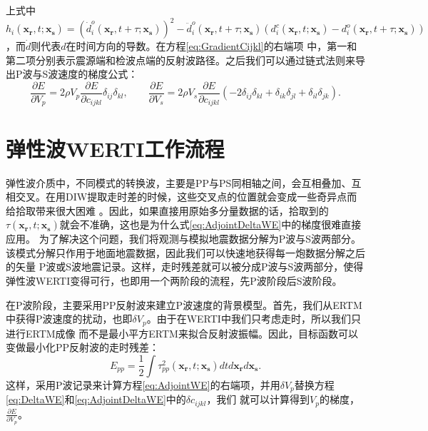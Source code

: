 上式中$h_i(\mathbf{x_r},t;\mathbf{x_s})=(\dot{d}^o_i(\mathbf{x_r},t+\tau;\mathbf{x_s}))^2-\ddot{d}^o_i(\mathbf{x_r},t+\tau;\mathbf{x_s})
(d^c_i(\mathbf{x_r},t;\mathbf{x_s})-d^o_i(\mathbf{x_r},t+\tau;\mathbf{x_s}))$，而$\dot{d}$则代表$d$在时间方向的导数。在方程\eqref{eq:GradientCijkl}的右端项
中，第一和第二项分别表示震源端和检波点端的反射波路径。之后我们可以通过链式法则来导出P波与S波速度的梯度公式：
\begin{equation}
    \frac{\partial E}{\partial V_p}=2\rho V_p\frac{\partial E}{\partial
        c_{ijkl}}\delta_{ij}\delta_{kl}, \qquad
    \frac{\partial E}{\partial V_s}=2\rho V_s\frac{\partial
    E}{\partial c_{ijkl}}(-2\delta_{ij}\delta_{kl}+\delta_{ik}\delta_{jl}+
    \delta_{il}\delta_{jk}).
    \label{eq:GradientVel}
\end{equation}
\section{弹性波WERTI工作流程}
弹性波介质中，不同模式的转换波，主要是PP与PS同相轴之间，会互相叠加、互相交叉。在用DIW提取走时差的时候，这些交叉点的位置就会变成一些奇异点而给拾取带来很大困难
。因此，如果直接用原始多分量数据的话，拾取到的$\tau(\mathbf{x_r},t;\mathbf{x_s})$就会不准确，这也是为什么式\eqref{eq:AdjointDeltaWE}中的梯度很难直接应用。
为了解决这个问题，我们将观测与模拟地震数据分解为P波与S波两部分。该模式分解只作用于地面地震数据\cite[]{Li2016a}，因此我们可以快速地获得每一炮数据分解之后的矢量
P波或S波地震记录。这样，走时残差就可以被分成P波与S波两部分，使得弹性波WERTI变得可行，也即用一个两阶段的流程，先P波阶段后S波阶段。

在P波阶段，主要采用PP反射波来建立P波速度的背景模型。首先，我们从ERTM中获得P波速度的扰动，也即$\delta V_p$。由于在WERTI中我们只考虑走时，所以我们只进行ERTM成像
而不是最小平方ERTM来拟合反射波振幅。因此，目标函数可以变做最小化PP反射波的走时残差：
\begin{equation}
    E_{pp}=\frac{1}{2}\int\tau^2_{pp}(\mathbf{x_r},t;\mathbf{x_s})dtd\mathbf{x_r}d\mathbf{x_s}.
    \label{eq:ObjectivefunctionPP} 
\end{equation}
这样，采用P波记录来计算方程\eqref{eq:AdjointWE}的右端项，并用$\delta V_p$替换方程\eqref{eq:DeltaWE}和\eqref{eq:AdjointDeltaWE}中的$\delta c_{ijkl}$，我们
就可以计算得到$V_p$的梯度， $\frac{\partial E}{\partial V_p}$。

